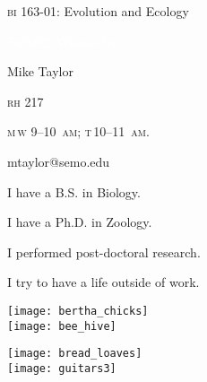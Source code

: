 \documentclass[t]{beamer}
\begin{document}
%
{
\begin{frame}[b]{\textcolor{orange7}{\textsc{bi} 163-01: Evolution and Ecology}}


\hfill\textcolor{white}{\tiny Fir0002, Wikimedia }
\end{frame}
}
%
{
\begin{frame}[t]
	\large
	\vspace{5ex}
	\hangpara\hspace{17em} Mike Taylor

	\hangpara\hspace{17em} \textsc{rh} 217

	\hangpara\hspace{17em} \textsc{m}\,\textsc{w} 9--10~\textsc{am}; \textsc{t}\,10--11~\textsc{am}.

	\hangpara\hspace{17em} mtaylor@semo.edu

\end{frame}
}
%
{
\begin{frame}[t]{I have a B.S. in Biology.}
		
\end{frame}
}
%
{
	\begin{frame}[t]{I have a Ph.D. in Zoology.}
		
	\end{frame}
}
%
{
	\begin{frame}[t]{I performed post-doctoral research.}
		
	\end{frame}
}
%
\begin{frame}[t]{I try to have a life outside of work.}

	\vspace*{-\baselineskip}
	
	\begin{multicols}{2}
		\texttt{[image: bertha\_chicks]} \\[1ex]
		\texttt{[image: bee\_hive]} \\
		
	\columnbreak
		
		\texttt{[image: bread\_loaves]} \\[1ex]
		\texttt{[image: guitars3]} \\
		
	\end{multicols}
		
\end{frame}
\end{document}
